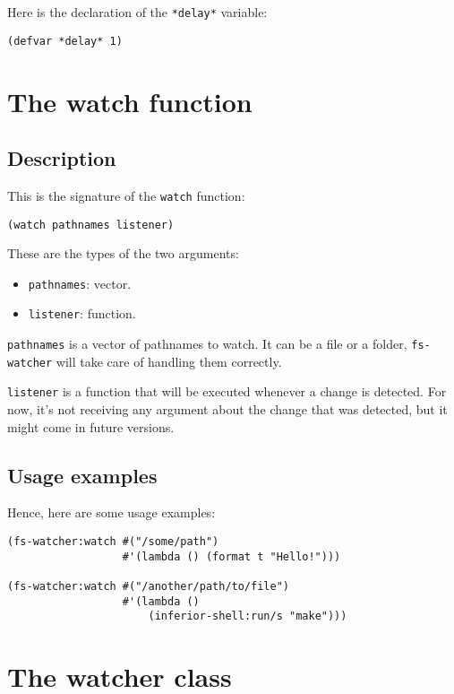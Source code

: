 \documentclass[a4paper]{report}
\newcommand{\code}{\texttt}
\begin{document}
Here is the declaration of the \code{*delay*} variable:

\begin{verbatim}
(defvar *delay* 1)
\end{verbatim}

\section{The watch function}

\subsection{Description}

This is the signature of the \code{watch} function:

\begin{verbatim}
(watch pathnames listener)
\end{verbatim}

These are the types of the two arguments:

\begin{itemize}
    \item \code{pathnames}: vector.
    \item \code{listener}: function.
\end{itemize}

\code{pathnames} is a vector of pathnames to watch. It can be a file or a
folder, \code{fs-watcher} will take care of handling them correctly.

\code{listener} is a function that will be executed whenever a change is
detected. For now, it's not receiving any argument about the change that was
detected, but it might come in future versions.

\subsection{Usage examples}

Hence, here are some usage examples:

\begin{verbatim}
(fs-watcher:watch #("/some/path")
                  #'(lambda () (format t "Hello!")))

(fs-watcher:watch #("/another/path/to/file")
                  #'(lambda ()
                      (inferior-shell:run/s "make")))
\end{verbatim}

\section{The watcher class}
\end{document}
